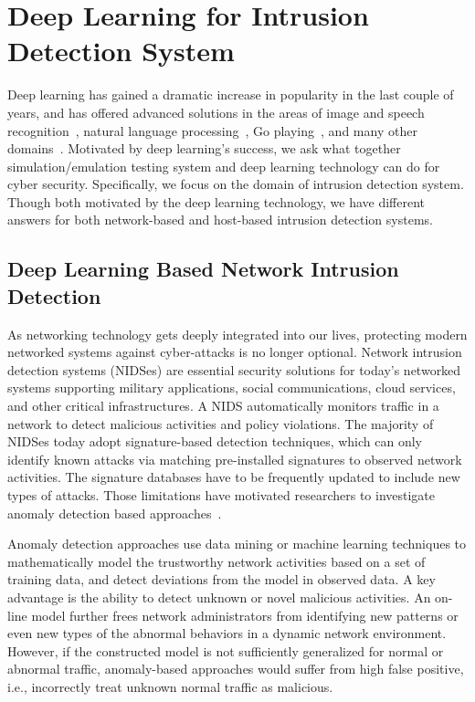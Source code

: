 \section{Deep Learning for Intrusion Detection System}
\label{DL:Sec:Intro}

Deep learning has gained a dramatic increase in popularity in the last couple of years,
and has offered advanced solutions in the areas of image and speech recognition~\cite{AlexNet, SpeechDNN},
natural language processing~\cite{Word2Vec}, Go playing~\cite{AlphaGo}, and many other domains~\cite{DeepLearning}. 
Motivated by deep learning's success, we ask what together simulation/emulation testing system and deep learning technology can do for cyber security.
Specifically, we focus on the domain of intrusion detection system.
Though both motivated by the deep learning technology, we have different answers for both network-based and host-based intrusion detection systems.


\subsection{Deep Learning Based Network Intrusion Detection}
\label{DL:SubSec:NIDS}

As networking technology gets deeply integrated into our lives, protecting modern networked systems against cyber-attacks is no longer optional.
Network intrusion detection systems (NIDSes) are essential security solutions for today's networked systems supporting military applications,
social communications, cloud services, and other critical infrastructures.
A NIDS automatically monitors traffic in a network to detect malicious activities and policy violations.
The majority of NIDSes today adopt signature-based detection techniques,
which can only identify known attacks via matching pre-installed signatures to observed network activities. 
The signature databases have to be frequently updated to include new types of attacks.
Those limitations have motivated researchers to investigate anomaly detection based approaches~\cite{STL-NIDS, LOF, RankingOutliner, NB-Tree, RampLossKSVCR, GAA-ADS}. 

Anomaly detection approaches use data mining or machine learning techniques to mathematically model the trustworthy network activities based on a set of training data,
and detect deviations from the model in observed data. A key advantage is the ability to detect unknown or novel malicious activities.
An on-line model further frees network administrators from identifying new patterns or even new types of the abnormal behaviors in a dynamic network environment.
However, if the constructed model is not sufficiently generalized for normal or abnormal traffic,
anomaly-based approaches would suffer from high false positive, i.e., incorrectly treat unknown normal traffic as malicious.


